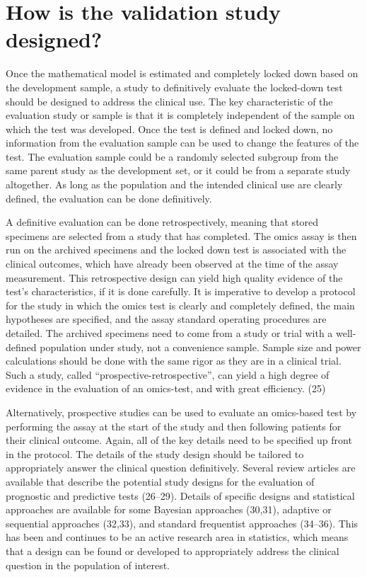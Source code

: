 \documentclass[11pt]{article}
\begin{document}
\section{How is the validation study
designed?}\label{how-is-the-validation-study-designed}

Once the mathematical model is estimated and completely locked down
based on the development sample, a study to definitively evaluate the
locked-down test should be designed to address the clinical use. The key
characteristic of the evaluation study or sample is that it is
completely independent of the sample on which the test was developed.
Once the test is defined and locked down, no information from the
evaluation sample can be used to change the features of the test. The
evaluation sample could be a randomly selected subgroup from the same
parent study as the development set, or it could be from a separate
study altogether. As long as the population and the intended clinical
use are clearly defined, the evaluation can be done definitively.

A definitive evaluation can be done retrospectively, meaning that stored
specimens are selected from a study that has completed. The omics assay
is then run on the archived specimens and the locked down test is
associated with the clinical outcomes, which have already been observed
at the time of the assay measurement. This retrospective design can
yield high quality evidence of the test's characteristics, if it is done
carefully. It is imperative to develop a protocol for the study in which
the omics test is clearly and completely defined, the main hypotheses
are specified, and the assay standard operating procedures are detailed.
The archived specimens need to come from a study or trial with a
well-defined population under study, not a convenience sample. Sample
size and power calculations should be done with the same rigor as they
are in a clinical trial. Such a study, called
``prospective-retrospective'', can yield a high degree of evidence in
the evaluation of an omics-test, and with great efficiency. (25)

Alternatively, prospective studies can be used to evaluate an
omics-based test by performing the assay at the start of the study and
then following patients for their clinical outcome. Again, all of the
key details need to be specified up front in the protocol. The details
of the study design should be tailored to appropriately answer the
clinical question definitively. Several review articles are available
that describe the potential study designs for the evaluation of
prognostic and predictive tests (26--29). Details of specific designs
and statistical approaches are available for some Bayesian approaches
(30,31), adaptive or sequential approaches (32,33), and standard
frequentist approaches (34--36). This has been and continues to be an
active research area in statistics, which means that a design can be
found or developed to appropriately address the clinical question in the
population of interest.
\end{document}
